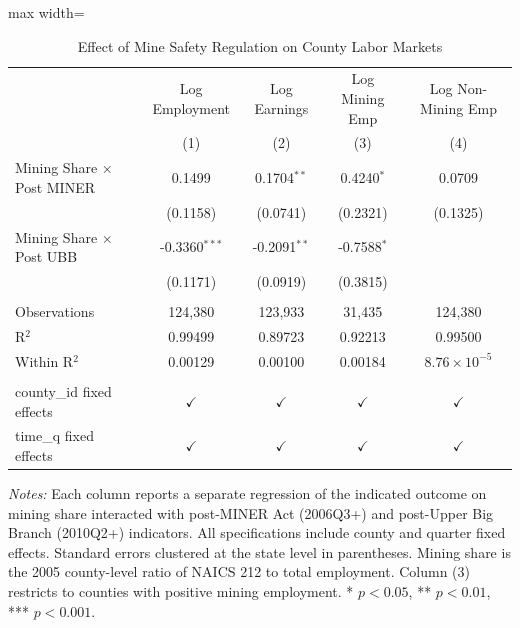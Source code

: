 \begin{table}[htbp]
   \caption{\label{tab:main} Effect of Mine Safety Regulation on County Labor Markets}
   \bigskip
   \centering
   \begin{adjustbox}{max width=\textwidth}
   \begin{tabular}{lcccc}
      \toprule
                                        & Log Employment  & Log Earnings   & Log Mining Emp & Log Non-Mining Emp\\
                                        & (1)             & (2)            & (3)            & (4)\\
      \midrule 
      Mining Share $\times$ Post MINER  & 0.1499          & 0.1704$^{**}$  & 0.4240$^{*}$   & 0.0709\\   
                                        & (0.1158)        & (0.0741)       & (0.2321)       & (0.1325)\\   
      Mining Share $\times$ Post UBB    & -0.3360$^{***}$ & -0.2091$^{**}$ & -0.7588$^{*}$  &   \\   
                                        & (0.1171)        & (0.0919)       & (0.3815)       &   \\   
       \\
      Observations                      & 124,380         & 123,933        & 31,435         & 124,380\\  
      R$^2$                             & 0.99499         & 0.89723        & 0.92213        & 0.99500\\  
      Within R$^2$                      & 0.00129         & 0.00100        & 0.00184        & $8.76\times 10^{-5}$\\   
       \\
      county\_id fixed effects          & $\checkmark$    & $\checkmark$   & $\checkmark$   & $\checkmark$\\   
      time\_q fixed effects             & $\checkmark$    & $\checkmark$   & $\checkmark$   & $\checkmark$\\   
      \bottomrule
   \end{tabular}
   \end{adjustbox}

   \par \raggedright
   \textit{Notes:} Each column reports a separate regression of the indicated outcome on mining share interacted with post-MINER Act (2006Q3+) and post-Upper Big Branch (2010Q2+) indicators. All specifications include county and quarter fixed effects. Standard errors clustered at the state level in parentheses. Mining share is the 2005 county-level ratio of NAICS 212 to total employment. Column (3) restricts to counties with positive mining employment. * $p<0.05$, ** $p<0.01$, *** $p<0.001$.
\end{table}
